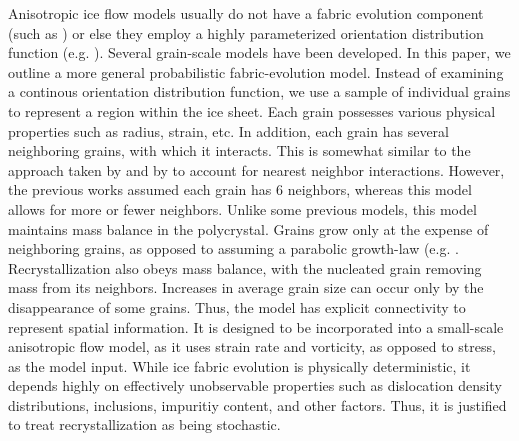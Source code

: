 \documentclass{igs}
\begin{document}
Anisotropic ice flow models usually do not have a fabric evolution component (such as \citet{pettit2007}) or else they employ a highly parameterized orientation distribution function (e.g. \citet{gillet2006}). Several grain-scale models have been developed. In this paper, we outline a more general probabilistic fabric-evolution model. Instead of examining a continous orientation distribution function, we use a sample of individual grains to represent a region within the ice sheet. Each grain possesses various physical properties such as radius, strain, etc. In addition, each grain has several neighboring grains, with which it interacts. This is somewhat similar to the approach taken by \citet{thorsteinsson2002nni} and by \citet{kennedy} to account for nearest neighbor interactions. However, the previous works assumed each grain has 6 neighbors, whereas this model allows for more or fewer neighbors. Unlike some previous models, this model maintains mass balance in the polycrystal. Grains grow only at the expense of neighboring grains, as opposed to assuming a parabolic growth-law (e.g. \citet{gow1969}. Recrystallization also obeys mass balance, with the nucleated grain removing mass from its neighbors. Increases in average grain size can occur only by the disappearance of some grains. Thus, the model has explicit connectivity to represent spatial information. It is designed to be incorporated into a small-scale anisotropic flow model, as it uses strain rate and vorticity, as opposed to stress, as the model input. While ice fabric evolution is physically deterministic, it depends highly on effectively unobservable properties such as dislocation density distributions, inclusions, impuritiy content, and other factors. Thus, it is justified to treat recrystallization as being stochastic. 
\end{document}
